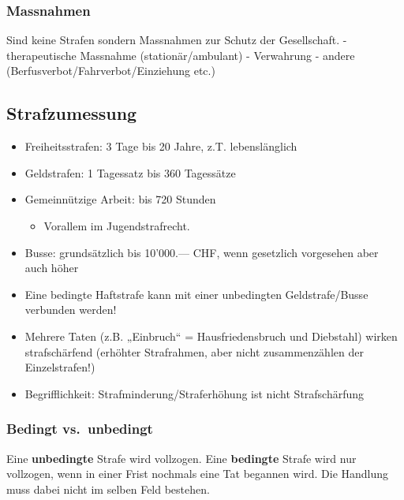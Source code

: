 \hypertarget{massnahmen}{%
\subsubsection{Massnahmen}\label{massnahmen}}

Sind keine Strafen sondern Massnahmen zur Schutz der Gesellschaft. -
therapeutische Massnahme (stationär/ambulant) - Verwahrung - andere
(Berfusverbot/Fahrverbot/Einziehung etc.)

\hypertarget{strafzumessung}{%
\subsection{Strafzumessung}\label{strafzumessung}}

\begin{itemize}
\tightlist
\item
  Freiheitsstrafen: 3 Tage bis 20 Jahre, z.T. lebenslänglich
\item
  Geldstrafen: 1 Tagessatz bis 360 Tagessätze
\item
  Gemeinnützige Arbeit: bis 720 Stunden

  \begin{itemize}
  \tightlist
  \item
    Vorallem im Jugendstrafrecht.
  \end{itemize}
\item
  Busse: grundsätzlich bis 10'000.--- CHF, wenn gesetzlich vorgesehen
  aber auch höher
\item
  Eine bedingte Haftstrafe kann mit einer unbedingten Geldstrafe/Busse
  verbunden werden!
\item
  Mehrere Taten (z.B. „Einbruch`` = Hausfriedensbruch und Diebstahl)
  wirken strafschärfend (erhöhter Strafrahmen, aber nicht zusammenzählen
  der Einzelstrafen!)
\item
  Begrifflichkeit: Strafminderung/Straferhöhung ist nicht Strafschärfung
\end{itemize}

\hypertarget{bedingt-vs.unbedingt}{%
\subsubsection{Bedingt vs.~unbedingt}\label{bedingt-vs.unbedingt}}

Eine \textbf{unbedingte} Strafe wird vollzogen. Eine \textbf{bedingte}
Strafe wird nur vollzogen, wenn in einer Frist nochmals eine Tat
begannen wird. Die Handlung muss dabei nicht im selben Feld bestehen.

